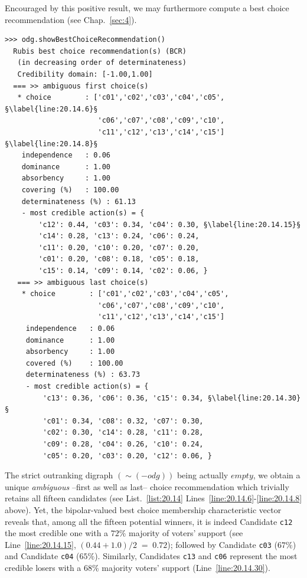 Encouraged by this positive result, we may furthermore compute a \Rubis best choice recommendation (see Chap.~\ref{sec:4}).
\begin{lstlisting}[caption={Computing a best social choice recommendation},label=list:20.14]
>>> odg.showBestChoiceRecommendation()
  Rubis best choice recommendation(s) (BCR)
   (in decreasing order of determinateness)   
   Credibility domain: [-1.00,1.00]
  === >> ambiguous first choice(s) 
   * choice        : ['c01','c02','c03','c04','c05', §\label{line:20.14.6}§
                      'c06','c07','c08','c09','c10',
                      'c11','c12','c13','c14','c15'] §\label{line:20.14.8}§
    independence   : 0.06
    dominance      : 1.00
    absorbency     : 1.00
    covering (%)   : 100.00
    determinateness (%) : 61.13
    - most credible action(s) = {
        'c12': 0.44, 'c03': 0.34, 'c04': 0.30, §\label{line:20.14.15}§
        'c14': 0.28, 'c13': 0.24, 'c06': 0.24,
        'c11': 0.20, 'c10': 0.20, 'c07': 0.20,
        'c01': 0.20, 'c08': 0.18, 'c05': 0.18,
        'c15': 0.14, 'c09': 0.14, 'c02': 0.06, }
   === >> ambiguous last choice(s)
    * choice        : ['c01','c02','c03','c04','c05',
                      'c06','c07','c08','c09','c10',
                      'c11','c12','c13','c14','c15']
     independence   : 0.06
     dominance      : 1.00
     absorbency     : 1.00
     covered (%)    : 100.00
     determinateness (%) : 63.73
     - most credible action(s) = {
         'c13': 0.36, 'c06': 0.36, 'c15': 0.34, §\label{line:20.14.30}§
         'c01': 0.34, 'c08': 0.32, 'c07': 0.30,
         'c02': 0.30, 'c14': 0.28, 'c11': 0.28,
         'c09': 0.28, 'c04': 0.26, 'c10': 0.24,
         'c05': 0.20, 'c03': 0.20, 'c12': 0.06, }
\end{lstlisting}

The strict outranking digraph $(\sim (-odg))$ being actually $empty$, we obtain a unique \emph{ambiguous} --first as well as last-- choice recommendation which trivially retains all fifteen candidates (see List.~\vref{list:20.14} Lines~\ref{line:20.14.6}-\ref{line:20.14.8} above). Yet, the bipolar-valued best choice membership characteristic vector reveals that, among all the fifteen potential winners, it is indeed Candidate \texttt{c12} the most credible one with a $72\%$ majority of voters' support (see Line~\ref{line:20.14.15}, $(0.44 + 1.0)/2\;=\; 0.72$); followed by Candidate \texttt{c03} ($67\%$) and Candidate \texttt{c04} ($65\%$). Similarly, Candidates \texttt{c13} and \texttt{c06} represent the most credible losers with a $68\%$ majority voters' support (Line~\ref{line:20.14.30}).

